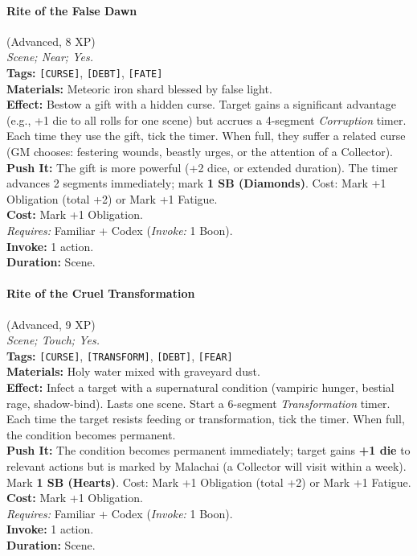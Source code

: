 \paragraph{Rite of the False Dawn} (Advanced, 8 XP) \hfill \\
\emph{Scene; Near; Yes.} \\
\textbf{Tags:} \texttt{[CURSE]}, \texttt{[DEBT]}, \texttt{[FATE]} \\
\textbf{Materials:} Meteoric iron shard blessed by false light. \\
\textbf{Effect:} Bestow a gift with a hidden curse. Target gains a significant advantage (e.g., +1 die to all rolls for one scene) but accrues a 4-segment \textit{Corruption} timer. Each time they use the gift, tick the timer. When full, they suffer a related curse (GM chooses: festering wounds, beastly urges, or the attention of a Collector). \\
\textbf{Push It:} The gift is more powerful (+2 dice, or extended duration). The timer advances 2 segments immediately; mark \textbf{1 SB (Diamonds)}. Cost: Mark +1 Obligation (total +2) or Mark +1 Fatigue. \\
\textbf{Cost:} Mark +1 Obligation. \\
\textit{Requires:} Familiar + Codex (\textit{Invoke:} 1 Boon). \\
\textbf{Invoke:} 1 action. \\
\textbf{Duration:} Scene.

\paragraph{Rite of the Cruel Transformation} (Advanced, 9 XP) \hfill \\
\emph{Scene; Touch; Yes.} \\
\textbf{Tags:} \texttt{[CURSE]}, \texttt{[TRANSFORM]}, \texttt{[DEBT]}, \texttt{[FEAR]} \\
\textbf{Materials:} Holy water mixed with graveyard dust. \\
\textbf{Effect:} Infect a target with a supernatural condition (vampiric hunger, bestial rage, shadow-bind). Lasts one scene. Start a 6-segment \textit{Transformation} timer. Each time the target resists feeding or transformation, tick the timer. When full, the condition becomes permanent. \\
\textbf{Push It:} The condition becomes permanent immediately; target gains \textbf{+1 die} to relevant actions but is marked by Malachai (a Collector will visit within a week). Mark \textbf{1 SB (Hearts)}. Cost: Mark +1 Obligation (total +2) or Mark +1 Fatigue. \\
\textbf{Cost:} Mark +1 Obligation. \\
\textit{Requires:} Familiar + Codex (\textit{Invoke:} 1 Boon). \\
\textbf{Invoke:} 1 action. \\
\textbf{Duration:} Scene.

